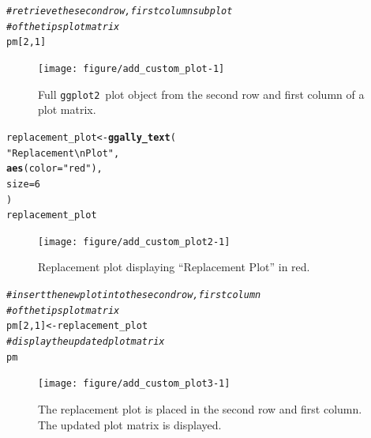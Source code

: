 \documentclass[stat,dissertation]{puthesis}\usepackage[]{graphicx}\usepackage{xcolor}
\makeatletter
\newcommand{\hlnum}[1]{\textcolor[rgb]{0.686,0.059,0.569}{#1}}%
\newcommand{\hlstr}[1]{\textcolor[rgb]{0.192,0.494,0.8}{#1}}%
\newcommand{\hlcom}[1]{\textcolor[rgb]{0.678,0.584,0.686}{\textit{#1}}}%
\newcommand{\hlstd}[1]{\textcolor[rgb]{0.345,0.345,0.345}{#1}}%
\newcommand{\hlkwb}[1]{\textcolor[rgb]{0.69,0.353,0.396}{#1}}%
\newcommand{\hlkwc}[1]{\textcolor[rgb]{0.333,0.667,0.333}{#1}}%
\newcommand{\hlkwd}[1]{\textcolor[rgb]{0.737,0.353,0.396}{\textbf{#1}}}%
\newenvironment{kframe}{%
 \def\at@end@of@kframe{}%
 \ifinner\ifhmode%
  \def\at@end@of@kframe{\end{minipage}}%
  \begin{minipage}{\columnwidth}%
 \fi\fi%
 \def\FrameCommand##1{\hskip\@totalleftmargin \hskip-\fboxsep
 \colorbox{shadecolor}{##1}\hskip-\fboxsep
     \hskip-\linewidth \hskip-\@totalleftmargin \hskip\columnwidth}%
 \MakeFramed {\advance\hsize-\width
   \@totalleftmargin\z@ \linewidth\hsize
   \@setminipage}}%
 {\par\unskip\endMakeFramed%
 \at@end@of@kframe}
\newenvironment{knitrout}{}{} %
\renewenvironment{knitrout}{\setstretch{1}}{}
\newcommand{\pkg}[1]{\texttt{#1}}
\newcommand{\ggplot}{\pkg{ggplot2}}
\makeatother
\begin{document}
\begin{knitrout}\small
{}\color{fgcolor}\begin{kframe}
\begin{alltt}
\hlcom{# retrieve the second row, first column sub plot}
\hlcom{#  of the tips plot matrix}
\hlstd{pm[}\hlnum{2}\hlstd{,}\hlnum{1}\hlstd{]}
\end{alltt}
\end{kframe}\begin{figure}[H]

{\centering \texttt{[image: figure/add\_custom\_plot-1]} 

}

\caption{Full \ggplot~plot object from the second row and first column of a  plot matrix.}\label{fig:add_custom_plot}
\end{figure}


\end{knitrout}
\newpage
\begin{knitrout}\small
{}\color{fgcolor}\begin{kframe}
\begin{alltt}
\hlstd{replacement_plot} \hlkwb{<-} \hlkwd{ggally_text}\hlstd{(}
  \hlstr{"Replacement\textbackslash{}nPlot"}\hlstd{,}
  \hlkwd{aes}\hlstd{(}\hlkwc{color} \hlstd{=} \hlstr{"red"}\hlstd{),}
  \hlkwc{size} \hlstd{=} \hlnum{6}
\hlstd{)}
\hlstd{replacement_plot}
\end{alltt}
\end{kframe}\begin{figure}[H]

{\centering \texttt{[image: figure/add\_custom\_plot2-1]} 

}

\caption{Replacement plot displaying ``Replacement Plot'' in red.}\label{fig:add_custom_plot2}
\end{figure}


\end{knitrout}
\newpage
\begin{knitrout}\small
{}\color{fgcolor}\begin{kframe}
\begin{alltt}
\hlcom{# insert the new plot into the second row, first column}
\hlcom{#  of the tips plot matrix}
\hlstd{pm[}\hlnum{2}\hlstd{,}\hlnum{1}\hlstd{]} \hlkwb{<-} \hlstd{replacement_plot}
\hlcom{# display the updated plot matrix}
\hlstd{pm}
\end{alltt}
\end{kframe}\begin{figure}[H]

{\centering \texttt{[image: figure/add\_custom\_plot3-1]} 

}

\caption{The replacement plot is placed in the second row and first column.  The updated plot matrix is displayed.}\label{fig:add_custom_plot3}
\end{figure}


\end{knitrout}
\end{document}
